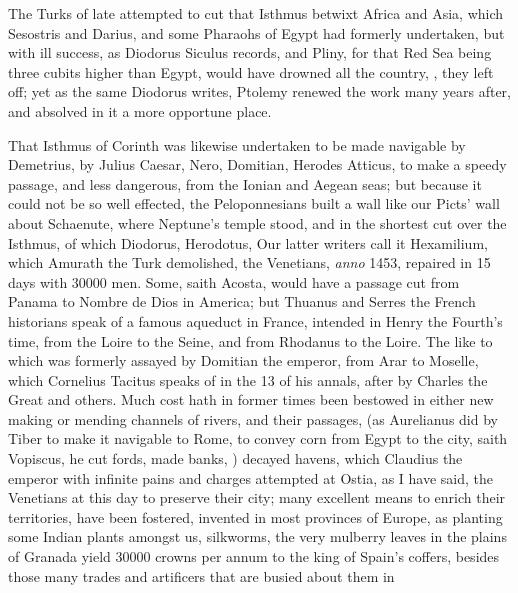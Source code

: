 The Turks of late attempted to cut that Isthmus betwixt Africa and Asia, which
Sesostris and Darius, and some Pharaohs of Egypt had
formerly undertaken, but with ill success, as Diodorus
Siculus records, and Pliny, for that Red Sea being three
cubits higher than Egypt, would have drowned all the
country, , they left off; yet as the same
Diodorus writes, Ptolemy renewed the work many years after,
and absolved in it a more opportune place.

That Isthmus of Corinth was likewise undertaken to be made navigable by
Demetrius, by Julius Caesar, Nero, Domitian, Herodes Atticus, to make a speedy
passage, and less dangerous, from the Ionian and Aegean
seas; but because it could not be so well effected, the Peloponnesians built a
wall like our Picts' wall about Schaenute, where Neptune's temple stood, and in
the shortest cut over the Isthmus, of which Diodorus,  Herodotus,  Our latter writers call
it Hexamilium, which Amurath the Turk demolished, the Venetians, \emph{anno}
1453, repaired in 15 days with 30\thinspace{}000 men. Some, saith Acosta, would
have a passage cut from Panama to Nombre de Dios in America; but Thuanus and
Serres the French historians speak of a famous aqueduct in France, intended in
Henry the Fourth's time, from the Loire to the Seine, and from Rhodanus to the
Loire. The like to which was formerly assayed by Domitian the emperor,
from Arar to Moselle, which Cornelius Tacitus speaks of in
the 13 of his annals, after by Charles the Great and others. Much cost hath in
former times been bestowed in either new making or mending channels of rivers,
and their passages, (as Aurelianus did by Tiber to make it navigable to Rome,
to convey corn from Egypt to the city,  saith
Vopiscus,  he cut fords, made banks, \etc{})
decayed havens, which Claudius the emperor with infinite pains and charges
attempted at Ostia, as I have said, the Venetians at this day to preserve their
city; many excellent means to enrich their territories, have been fostered,
invented in most provinces of Europe, as planting some Indian plants amongst
us, silkworms, the very mulberry leaves in the plains of
Granada yield 30\thinspace{}000 crowns per annum to the king of Spain's
coffers, besides those many trades and artificers that are busied about them in
